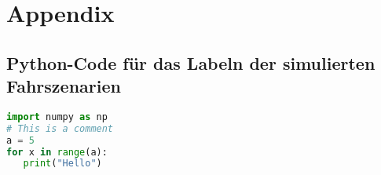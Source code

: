 
\chapter{Appendix}
\label{appendix}

\section{Python-Code für das Labeln der simulierten Fahrszenarien}
\label{appendix_code_labeling}

\begin{lstlisting}[language=Python]
import numpy as np
# This is a comment
a = 5
for x in range(a):
   print("Hello")
\end{lstlisting}

